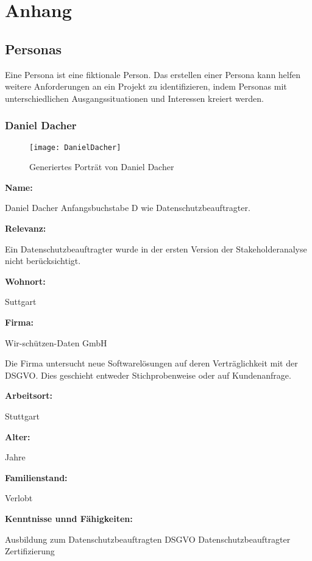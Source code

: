 \chapter{Anhang}
\label{ch:anhang}





\section{Personas}
\label{sec:personas}

Eine Persona ist eine fiktionale Person. Das erstellen einer Persona kann helfen weitere Anforderungen an ein Projekt zu identifizieren, indem Personas mit unterschiedlichen Ausgangssituationen und Interessen kreiert werden.

\pagebreak
\subsection{Daniel Dacher}
\label{subsec:danieldacher}

\begin{figure}[htpb]
    \centering
    \texttt{[image: DanielDacher]}
    \caption{Generiertes Porträt von Daniel Dacher \cite{misc:danieldacher}}
    \label{img:danieldacher}
\end{figure}
\textbf{Name:}
\par
\begingroup
\leftskip=30pt
\noindent
Daniel Dacher \newline
Anfangsbuchstabe D wie Datenschutzbeauftragter.
\par
\endgroup
\textbf{Relevanz:}
\par
\begingroup
\leftskip=30pt
\noindent
Ein Datenschutzbeauftragter wurde in der ersten Version der Stakeholderanalyse nicht berücksichtigt.
\par
\endgroup
\textbf{Wohnort:}
\par
\begingroup
\leftskip=30pt
\noindent
Suttgart
\par
\endgroup
\textbf{Firma:}
\par
\begingroup
\leftskip=30pt
\noindent
Wir-schützen-Daten GmbH

Die Firma untersucht neue Softwarelösungen auf deren Verträglichkeit mit der DSGVO. Dies geschieht entweder Stichprobenweise oder auf Kundenanfrage.
\par
\endgroup
\textbf{Arbeitsort:}
\par
\begingroup
\leftskip=30pt
\noindent
Stuttgart
\par
\endgroup
\textbf{Alter:}
\par
\begingroup
\leftskip=30pt
 Jahre
\par
\endgroup
\textbf{Familienstand:}
\par
\begingroup
\leftskip=30pt
\noindent
Verlobt
\par
\endgroup
\textbf{Kenntnisse unnd Fähigkeiten:}
\par
\begingroup
\leftskip=30pt
\noindent
Ausbildung zum Datenschutzbeauftragten \newline
DSGVO Datenschutzbeauftragter Zertifizierung
\par
\endgroup

